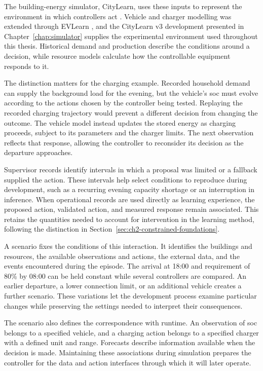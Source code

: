 The building-energy simulator, CityLearn, uses these inputs to represent the environment in which controllers act \parencite{nweye2025citylearnv2}. Vehicle and charger modelling was extended through EVLearn \parencite{fonseca2025evlearn}, and the CityLearn v3 development presented in Chapter~\ref{chap:simulator} supplies the experimental environment used throughout this thesis. Historical demand and production describe the conditions around a decision, while resource models calculate how the controllable equipment responds to it.

The distinction matters for the charging example. Recorded household demand can supply the background load for the evening, but the vehicle's \gls{soc} must evolve according to the actions chosen by the controller being tested. Replaying the recorded charging trajectory would prevent a different decision from changing the outcome. The vehicle model instead updates the stored energy as charging proceeds, subject to its parameters and the charger limits. The next observation reflects that response, allowing the controller to reconsider its decision as the departure approaches.

Supervisor records identify intervals in which a proposal was limited or a fallback supplied the action. These intervals help select conditions to reproduce during development, such as a recurring evening capacity shortage or an interruption in inference. When operational records are used directly as learning experience, the proposed action, validated action, and measured response remain associated. This retains the quantities needed to account for intervention in the learning method, following the distinction in Section~\ref{sec:ch2-constrained-foundations}.

A scenario fixes the conditions of this interaction. It identifies the buildings and resources, the available observations and actions, the external data, and the events encountered during the episode. The arrival at 18:00 and requirement of 80\% by 08:00 can be held constant while several controllers are compared. An earlier departure, a lower connection limit, or an additional vehicle creates a further scenario. These variations let the development process examine particular changes while preserving the settings needed to interpret their consequences.

The scenario also defines the correspondence with runtime. An observation of \gls{soc} belongs to a specified vehicle, and a charging action belongs to a specified charger with a defined unit and range. Forecasts describe information available when the decision is made. Maintaining these associations during simulation prepares the controller for the data and action interfaces through which it will later operate.

